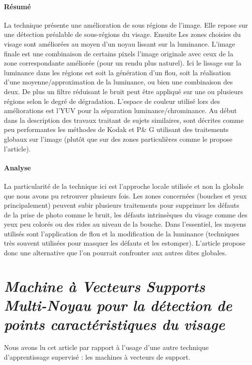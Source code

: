 \documentclass[11pt, french]{report-rd-info}
\begin{document}
\paragraph{Résumé}
La technique présente une amélioration de sous régions de l’image.  Elle repose sur une détection préalable de sous-régions du visage. Ensuite
Les zones choisies du visage sont améliorées au moyen d'un noyau lissant sur la luminance. L'image finale est une combinaison de certains pixels l'image originale avec ceux de la zone correspondante améliorée (pour un rendu plus naturel).
Ici le lissage sur la luminance dans les régions est soit la génération d’un flou, soit la réalisation d’une moyenne/approximation de la luminance, ou bien une combinaison des deux. De plus un filtre réduisant le bruit peut être appliqué sur une ou plusieurs régions selon le degré de dégradation.
L’espace de couleur utilisé lors des améliorations est l’YUV pour la séparation luminance/chrominance.
Au début dans la description des travaux traitant de sujets similaires, sont décrites comme peu performantes les méthodes de Kodak et P\& G utilisant des traitements globaux sur l'image (plutôt que sur des zones particulières comme le propose l’article).

\paragraph{Analyse}
La particularité de la technique ici est l’approche locale utilisée et non la globale que nous avons pu retrouver plusieurs fois. Les zones concernées (bouches et yeux principalement) peuvent subir plusieurs traitements pour supprimer les défauts de la prise de photo comme le bruit, les défauts intrinsèques du visage comme des yeux peu colorés ou des rides au niveau de la bouche. Dans l’essentiel, les moyens utilisés sont l’application de flou et la modification de la luminance (techniques très souvent utilisées pour masquer les défauts et les estomper). L’article propose donc une alternative que l’on pourrait confronter aux autres dites globales.

\section{\emph{Machine à Vecteurs Supports Multi-Noyau pour la détection de points caractéristiques du visage}}
Nous avons lu cet article \cite{Rapp2012} par rapport à l’usage d’une autre technique d’apprentissage supervisé : les machines à vecteurs de support.
\end{document}
